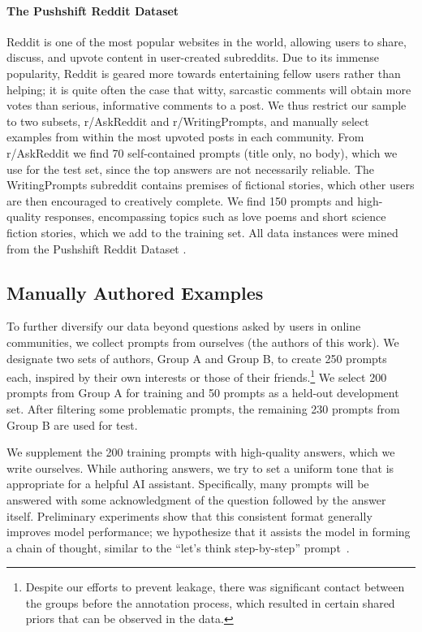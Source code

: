 \paragraph{The Pushshift Reddit Dataset}
Reddit is one of the most popular websites in the world, allowing users to share, discuss, and upvote content in user-created subreddits.
Due to its immense popularity, Reddit is geared more towards entertaining fellow users rather than helping; it is quite often the case that witty, sarcastic comments will obtain more votes than serious, informative comments to a post.
We thus restrict our sample to two subsets, r/AskReddit and r/WritingPrompts, and manually select examples from within the most upvoted posts in each community.
From r/AskReddit we find 70 self-contained prompts (title only, no body), which we use for the test set, since the top answers are not necessarily reliable.
The WritingPrompts subreddit contains premises of fictional stories, which other users are then encouraged to creatively complete.
We find 150 prompts and high-quality responses, encompassing topics such as love poems and short science fiction stories, which we add to the training set.
All data instances were mined from the Pushshift Reddit Dataset \citep{baumgartner2020pushshift}.%


\subsection{Manually Authored Examples}
\label{sec:manual_data}

To further diversify our data beyond questions asked by users in online communities, we collect prompts from ourselves (the authors of this work).
We designate two sets of authors, Group A and Group B, to create 250 prompts each, inspired by their own interests or those of their friends.\footnote{Despite our efforts to prevent leakage, there was significant contact between the groups before the annotation process, which resulted in certain shared priors that can be observed in the data.}
We select 200 prompts from Group A for training and 50 prompts as a held-out development set.
After filtering some problematic prompts, the remaining 230 prompts from Group B are used for test.

We supplement the 200 training prompts with high-quality answers, which we write ourselves.
While authoring answers, we try to set a uniform tone that is appropriate for a helpful AI assistant.
Specifically, many prompts will be answered with some acknowledgment of the question followed by the answer itself.
Preliminary experiments show that this consistent format generally improves model performance; we hypothesize that it assists the model in forming a chain of thought, similar to the ``let's think step-by-step'' prompt~\citep{kojima2022large,weichain}.

